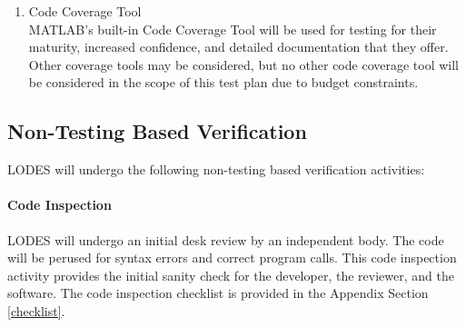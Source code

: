 \documentclass[12pt, titlepage]{article}
\newcommand{\famname}{LODES} %
\begin{document}
\begin{enumerate}
\item{Code Coverage Tool\\}
MATLAB's built-in Code Coverage Tool will be used for testing for their
maturity, increased confidence, and detailed documentation that they offer. Other coverage tools may be 
considered, but no other code coverage tool will be considered in the scope of this
test plan due to budget constraints. 


\end{enumerate}


		

\subsection{Non-Testing Based Verification}
\famname{} will undergo the following non-testing based verification activities:

\paragraph{Code Inspection\\}
\famname{} will undergo an initial desk review by an independent body.  The code
will be perused for syntax errors and correct program calls.  This code
inspection activity provides the initial sanity check for the developer, the
reviewer, and the software. The code inspection checklist
is provided in the Appendix Section \ref{checklist}.

\end{document}
